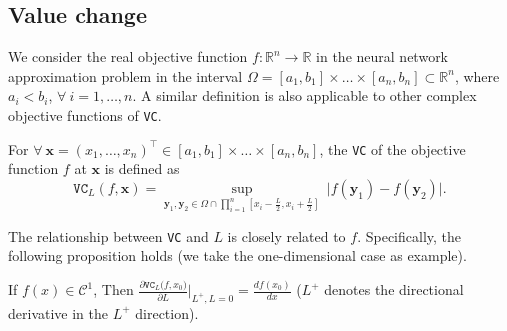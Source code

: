 \documentclass[final]{siamart220329}
\newtheorem{theoretical insights}{Theoretical insights}
\newtheorem{practical takeaway}{Practical takeaway}
\begin{document}
\subsection{\color{black}Value change}

We consider the real objective function \(f:\mathbb{R}^n \rightarrow\mathbb{R}\) in the neural network approximation problem in the interval \(\Omega=[a_1,b_1]\times\dots\times [a_n,b_n] \subset \mathbb{R}^n\), where \(a_i < b_i\), \(\forall \ i=1,\dots,n\). A similar definition is also applicable to other complex objective functions of \texttt{VC}.  

\begin{definition}\label{VC}
For \(\forall\ {\bm x}=(x_1,\dots,x_n)^{\top} \in [a_1,b_1]\times\dots\times [a_n,b_n]\),  the \texttt{VC} of the objective function \(f\) at  \({\bm x}\) is defined as  
\begin{equation}
\texttt{VC}_{L}(f,{\bm x}) = \sup_{{\bm y}_1, {\bm y}_2 \in \Omega \cap \prod_{i=1}^{n} [{x}_i-\frac{L}{2}, {x}_i+\frac{L}{2}]} \ \vert f({\bm y}_1)-f({\bm y}_2)\vert.  
\end{equation}
\end{definition}



The relationship between \texttt{VC} and $L$ is closely related to $f$. 
Specifically, the following proposition holds (we take the one-dimensional case as example).

\begin{proposition}
If $f({x})\in\mathcal{C}^1$, Then $\frac{\partial\texttt{VC}_L(f,{x_0)}}{\partial L}\Big|_{L^+,L=0}=\frac{df(x_0)}{dx}$ ($L^+$ denotes the directional derivative in the $L^+$ direction). 
\end{proposition}
\end{document}
